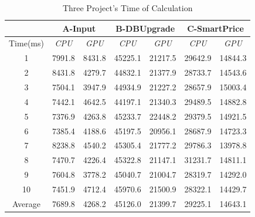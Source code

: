\begin{table}
  \centering
  \caption{Three Project's Time of Calculation}
  \label{tab:consuming}
  \begin{tabular}{ccccccc}
    \hline
      & \multicolumn{2}{c}{ A-Input } & \multicolumn{2}{c}{ B-DBUpgrade } & \multicolumn{2}{c}{ C-SmartPrice } \\
    \hline
      Time(ms) & \emph{ CPU } & \emph{ GPU } & \emph{ CPU } & \emph{ GPU } & \emph{ CPU } & \emph{ GPU }\\
    \hline
     1 & 7991.8 & 8431.8 & 45225.1 & 21217.5 & 29642.9 & 14844.3 \\
     2 & 8431.8 & 4279.7 & 44832.1 & 21377.9 & 28733.7 & 14543.6 \\
     3 & 7504.1 & 3947.9 & 44934.9 & 21227.2 & 28657.9 & 15003.4 \\
     4 & 7442.1 & 4642.5 & 44197.1 & 21340.3 & 29489.5 & 14882.8 \\
     5 & 7376.9 & 4263.8 & 45233.7 & 22448.2 & 29379.5 & 14921.5 \\
     6 & 7385.4 & 4188.6 & 45197.5 & 20956.1 & 28687.9 & 14723.3 \\
     7 & 8238.8 & 4540.2 & 45305.4 & 21777.2 & 29786.3 & 13978.8 \\
     8 & 7470.7 & 4226.4 & 45322.8 & 21147.1 & 31231.7 & 14811.1 \\
     9 & 7604.8 & 3778.2 & 45040.7 & 21004.7 & 28319.7 & 14292.0 \\
     10  & 7451.9 & 4712.4 & 45970.6 & 21500.9 & 28322.1 & 14429.7 \\
     Average & 7689.8 & 4268.2 & 45126.0 & 21399.7 & 29225.1 & 14643.1 \\
    \hline
  \end{tabular}
\end{table}


